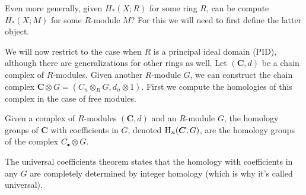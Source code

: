 Even more generally, given $H_\ast(X;R)$ for some ring $R$, can be compute $H_\ast(X;M)$ for some $R$-module $M$? For this we will need to first define the latter object.


We will now restrict to the case when $R$ is a principal ideal domain (PID), although there are generalizations for other rings as well. Let $(\bm{C},d)$ be a chain complex of $R$-modules.  Given another $R$-module $G$, we can construct the chain complex $\bm{C}\otimes G=(C_n\otimes_R G,d_n\otimes 1)$. First we compute the homologies of this complex in the case of free modules. 

\begin{defn}
    Given a complex of $R$-modules $(\bm{C},d)$ and an $R$-module $G$, the homology groups of $\bm{C}$ with coefficients in $G$, denoted $\mathrm{H}_n(\boldsymbol{C},G)$, are the homology groups of the complex $C_\bullet\otimes G$.
\end{defn}

The universal coefficients theorem states that the homology with coefficients in any $G$ are completely determined by integer homology (which is why it's called universal).

